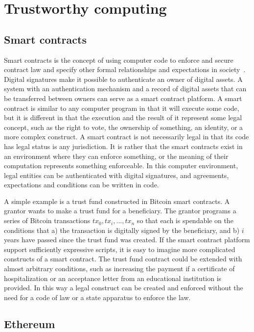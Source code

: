 \section{Trustworthy computing}
\label{sec:trustworthy}

\subsection{Smart contracts}

Smart contracts is the concept of using computer code to enforce and secure contract law and specify other formal relationships and expectations in  society~\cite{szabo_formalizing_1997}. Digital signatures make it possible to authenticate an owner of digital assets. A system with an authentication mechanism and a record of digital assets that can be transferred between owners can serve as a smart contract platform. A smart contract is similar to any computer program in that it will execute some code, but it is different in that the execution and the result of it represent some legal concept, such as the right to vote, the ownership of something, an identity, or a more complex construct. A smart contract is not necessarily legal in that its code has legal status is any jurisdiction. It is rather that the smart contracts exist in an environment where they can enforce something, or the meaning of their computation represents something enforceable. In this computer environment, legal entities can be authenticated with digital signatures, and agreements, expectations and conditions can be written in code.

A simple example is a trust fund constructed in Bitcoin smart contracts. A grantor wants to make a trust fund for a beneficiary. The grantor programs a series of Bitcoin transactions ${tx_0, tx_i, ..., tx_n}$ so that each is spendable on the conditions that a) the transaction is digitally signed by the beneficiary, and b) $i$ years have passed since the trust fund was created. If the smart contract platform support sufficiently expressive scripts, it is easy to imagine more complicated constructs of a smart contract. The trust fund contract could be extended with almost arbitrary conditions, such as increasing the payment if a certificate of hospitalization or an acceptance letter from an educational institution is provided. In this way a legal construct can be created and enforced without the need for a code of law or a state apparatus to enforce the law.

\subsection{Ethereum}

